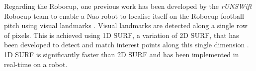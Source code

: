 Regarding the Robocup, one previous work has been developed by the \textit{rUNSWift} Robocup team to enable a Nao robot to localise itself on the Robocup football pitch using visual landmarks \citep{Anderson}. Visual landmarks are detected along a single row of pixels. This is achieved using 1D SURF, a variation of 2D SURF, that has been developed to detect and match interest points along this single dimension \citep{Anderson}. 1D SURF is significantly faster than 2D SURF and has been implemented in real-time on a robot.\\














